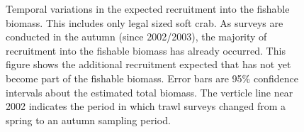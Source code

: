 \documentclass[11pt]{article}
\newcommand*{\D}{.}  %
\begin{document}
\begin{figure}[ht]
\begin{center}
\end{center}
\caption{Temporal variations in the expected recruitment into the fishable biomass. This includes only legal sized soft crab. As surveys are conducted in the autumn (since 2002/2003), the majority of recruitment into the fishable biomass has already occurred. This figure shows the additional recruitment expected that has not yet become part of the fishable biomass.  Error bars are 95\% confidence intervals about the estimated total biomass. The verticle line near 2002 indicates the period in which trawl surveys changed from a spring to an autumn sampling period.}
\label{ts.R1a.no}
\end{figure}



\clearpage \newpage
\end{document}
